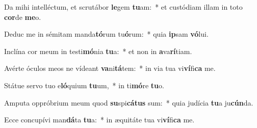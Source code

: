 \item Da mihi intelléctum, et scrutábor \textbf{le}gem \textbf{tu}am:~* et custódiam illam in toto \textbf{cor}de \textbf{me}o.
\item Deduc me in sémitam manda\textbf{tó}rum tu\textbf{ó}rum:~* quia \textbf{ip}sam \textbf{vó}lui.
\item Inclína cor meum in testi\textbf{mó}nia \textbf{tu}a:~* et non in \textbf{a}va\textbf{rí}tiam.
\item Avérte óculos meos ne vídeant \textbf{va}ni\textbf{tá}tem:~* in via tua vi\textbf{ví}fi\textbf{ca} me.
\item Státue servo tuo e\textbf{ló}quium \textbf{tu}um,~* in ti\textbf{mó}re \textbf{tu}o.
\item Amputa oppróbrium meum quod \textbf{su}spi\textbf{cá}\textbf{tus} sum:~* quia judícia \textbf{tu}a ju\textbf{cún}da.
\item Ecce concupívi man\textbf{dá}ta \textbf{tu}a:~* in æquitáte tua vi\textbf{ví}fi\textbf{ca} me.
